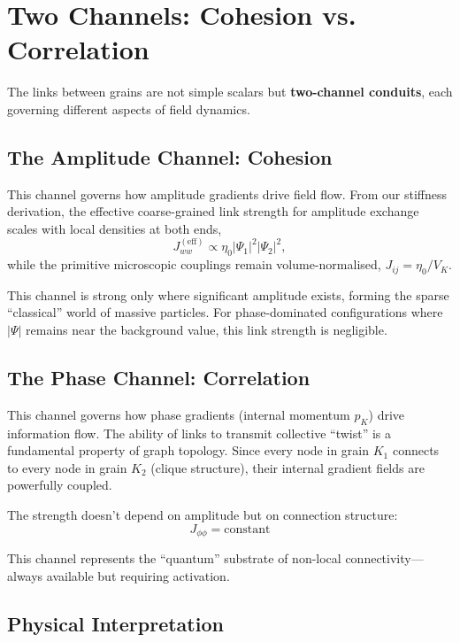 \documentclass[11pt]{article}
\begin{document}
\section{Two Channels: Cohesion vs. Correlation}

The links between grains are not simple scalars but \textbf{two-channel conduits}, each governing different aspects of field dynamics.

\subsection{The Amplitude Channel: Cohesion}

This channel governs how amplitude gradients drive field flow. From our stiffness derivation, the effective coarse-grained link strength for amplitude exchange scales with local densities at both ends,
\begin{equation}
J_{ww}^{\mathrm{(eff)}} \propto \eta_0 |\Psi_1|^2 |\Psi_2|^2,
\end{equation}
while the primitive microscopic couplings remain volume-normalised, $J_{ij}=\eta_0/V_K$.

This channel is strong only where significant amplitude exists, forming the sparse ``classical'' world of massive particles. For phase-dominated configurations where $|\Psi|$ remains near the background value, this link strength is negligible.

\subsection{The Phase Channel: Correlation}

This channel governs how phase gradients (internal momentum $p_K$) drive information flow. The ability of links to transmit collective ``twist'' is a fundamental property of graph topology. Since every node in grain $K_1$ connects to every node in grain $K_2$ (clique structure), their internal gradient fields are powerfully coupled.

The strength doesn't depend on amplitude but on connection structure:
\begin{equation}
J_{\phi\phi} = \text{constant}
\end{equation}

This channel represents the ``quantum'' substrate of non-local connectivity—always available but requiring activation.

\subsection{Physical Interpretation}
\end{document}
